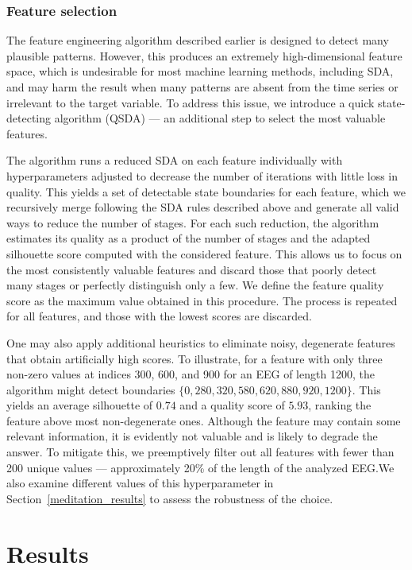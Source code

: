 \documentclass[pdflatex,sn-basic,Numbered]{sn-jnl}
\begin{document}
\subsubsection{Feature selection}

The feature engineering algorithm described earlier is designed to detect many plausible patterns. However, this produces an extremely high-dimensional feature space, which is undesirable for most machine learning methods, including SDA, and may harm the result when many patterns are absent from the time series or irrelevant to the target variable. To address this issue, we introduce a quick state-detecting algorithm (QSDA) --- an additional step to select the most valuable features.

The algorithm runs a reduced SDA on each feature individually with hyperparameters adjusted to decrease the number of iterations with little loss in quality. This yields a set of detectable state boundaries for each feature, which we recursively merge following the SDA rules described above and generate all valid ways to reduce the number of stages. For each such reduction, the algorithm estimates its quality as a product of the number of stages and the adapted silhouette score computed with the considered feature. This allows us to focus on the most consistently valuable features and discard those that poorly detect many stages or perfectly distinguish only a few. We define the feature quality score as the maximum value obtained in this procedure. The process is repeated for all features, and those with the lowest scores are discarded.

One may also apply additional heuristics to eliminate noisy, degenerate features that obtain artificially high scores. To illustrate, for a feature with only three non-zero values at indices 300, 600, and 900 for an EEG of length 1200, the algorithm might detect boundaries $\{ 0, 280, 320, 580, 620, 880, 920, 1200 \}$. This yields an average silhouette of $0.74$ and a quality score of $5.93$, ranking the feature above most non-degenerate ones. Although the feature may contain some relevant information, it is evidently not valuable and is likely to degrade the answer. To mitigate this, we preemptively filter out all features with fewer than 200 unique values --- approximately 20\% of the length of the analyzed EEG.\@ We also examine different values of this hyperparameter in Section~\ref{meditation_results} to assess the robustness of the choice.

\section{Results}
\end{document}
